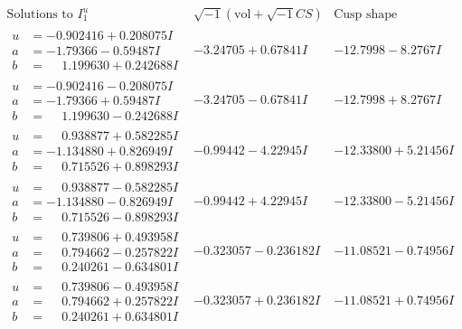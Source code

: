 \documentclass[1p]{elsarticle_modified}
\theoremstyle{definition}
\newcommand{\I}{\sqrt{-1}}
\begin{document}
$$\begin{array}{c|c|c}  
\text{Solutions to }I^u_{1}& \I (\text{vol} + \sqrt{-1}CS) & \text{Cusp shape}\\
 \hline 
\begin{aligned}
u &= -0.902416 + 0.208075 I \\
a &= -1.79366 - 0.59487 I \\
b &= \phantom{-}1.199630 + 0.242688 I\end{aligned}
 & -3.24705 + 0.67841 I & -12.7998 - 8.2767 I \\ \hline\begin{aligned}
u &= -0.902416 - 0.208075 I \\
a &= -1.79366 + 0.59487 I \\
b &= \phantom{-}1.199630 - 0.242688 I\end{aligned}
 & -3.24705 - 0.67841 I & -12.7998 + 8.2767 I \\ \hline\begin{aligned}
u &= \phantom{-}0.938877 + 0.582285 I \\
a &= -1.134880 + 0.826949 I \\
b &= \phantom{-}0.715526 + 0.898293 I\end{aligned}
 & -0.99442 - 4.22945 I & -12.33800 + 5.21456 I \\ \hline\begin{aligned}
u &= \phantom{-}0.938877 - 0.582285 I \\
a &= -1.134880 - 0.826949 I \\
b &= \phantom{-}0.715526 - 0.898293 I\end{aligned}
 & -0.99442 + 4.22945 I & -12.33800 - 5.21456 I \\ \hline\begin{aligned}
u &= \phantom{-}0.739806 + 0.493958 I \\
a &= \phantom{-}0.794662 - 0.257822 I \\
b &= \phantom{-}0.240261 - 0.634801 I\end{aligned}
 & -0.323057 - 0.236182 I & -11.08521 - 0.74956 I \\ \hline\begin{aligned}
u &= \phantom{-}0.739806 - 0.493958 I \\
a &= \phantom{-}0.794662 + 0.257822 I \\
b &= \phantom{-}0.240261 + 0.634801 I\end{aligned}
 & -0.323057 + 0.236182 I & -11.08521 + 0.74956 I \\ \hline\begin{aligned}

\end{aligned}
\end{array}$$
\end{document}
